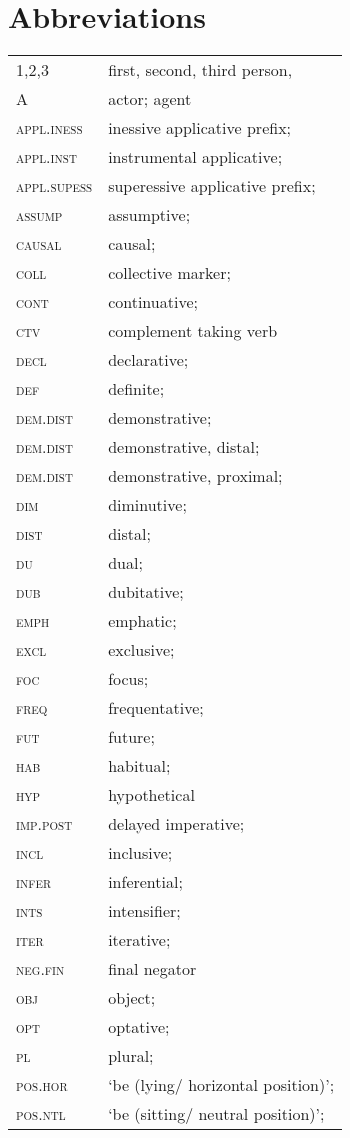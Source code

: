 \documentclass[output=paper]{langscibook}
\begin{document}
\section*{Abbreviations}
\begin{tabularx}{\textwidth}{lQ}
1,2,3   & first, second, third person,  \\
\textsc{A}  & actor; agent   \\
\textsc{appl.iness }  & inessive applicative prefix;  \\
\textsc{appl.inst} & instrumental applicative;  \\
\textsc{appl.supess } & superessive applicative prefix;  \\
\textsc{assump}   & assumptive;    \\
\textsc{causal} & causal;  \\
\textsc{coll}  & collective marker;   \\
\textsc{cont}  & continuative;  \\
\textsc{ctv} & complement taking verb  \\
\textsc{decl }  & declarative;   \\
\textsc{def }   & definite;   \\
\textsc{dem.dist}   & demonstrative;    \\
\textsc{dem.dist}  & demonstrative, distal;  \\
\textsc{dem.dist}  & demonstrative, proximal;   \\
\textsc{dim} & diminutive;    \\
\textsc{dist }  & distal;  \\
\textsc{du } & dual;    \\
\textsc{dub} & dubitative;    \\
\textsc{emph }  & emphatic;   \\
\textsc{excl }  & exclusive;  \\
\textsc{foc} & focus;   \\
\textsc{freq}   & frequentative;    \\
\textsc{fut}   & future;  \\
\textsc{hab} & habitual;   \\
\textsc{hyp}   & hypothetical   \\
\textsc{imp.post} & delayed imperative;  \\
\textsc{incl}  & inclusive;  \\
\textsc{infer}  & inferential;   \\
\textsc{ints}   & intensifier;   \\
\textsc{iter}   & iterative;  \\
\textsc{neg.fin}   & final negator  \\
\textsc{obj} & object;  \\
\textsc{opt} & optative;   \\
\textsc{pl} & plural;  \\
\textsc{pos.hor}  & `be (lying/ horizontal position)';  \\
\textsc{pos.ntl}  & `be (sitting/ neutral position)';   \\
\end{tabularx}
\end{document}
